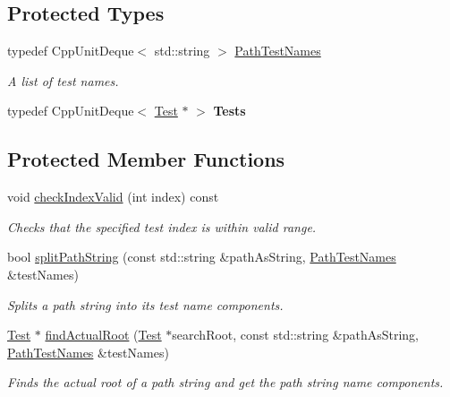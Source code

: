 \subsection*{Protected Types}
\begin{DoxyCompactItemize}
\item 
\hypertarget{class_test_path_a525c33f5b897710bf37cf593160e562a}{typedef Cpp\-Unit\-Deque$<$ std\-::string $>$ \hyperlink{class_test_path_a525c33f5b897710bf37cf593160e562a}{Path\-Test\-Names}}\label{class_test_path_a525c33f5b897710bf37cf593160e562a}

\begin{DoxyCompactList}\small\item\em A list of test names. \end{DoxyCompactList}\item 
\hypertarget{class_test_path_aa1f2a0a7e01597a16ed041776297fbdf}{typedef Cpp\-Unit\-Deque$<$ \hyperlink{class_test}{Test} $\ast$ $>$ {\bfseries Tests}}\label{class_test_path_aa1f2a0a7e01597a16ed041776297fbdf}

\end{DoxyCompactItemize}
\subsection*{Protected Member Functions}
\begin{DoxyCompactItemize}
\item 
void \hyperlink{class_test_path_aebf839170b1a9e8199dd26f307028b6a}{check\-Index\-Valid} (int index) const 
\begin{DoxyCompactList}\small\item\em Checks that the specified test index is within valid range. \end{DoxyCompactList}\item 
bool \hyperlink{class_test_path_a7b65b26e7287763ca94ff0fadca37652}{split\-Path\-String} (const std\-::string \&path\-As\-String, \hyperlink{class_test_path_a525c33f5b897710bf37cf593160e562a}{Path\-Test\-Names} \&test\-Names)
\begin{DoxyCompactList}\small\item\em Splits a path string into its test name components. \end{DoxyCompactList}\item 
\hyperlink{class_test}{Test} $\ast$ \hyperlink{class_test_path_a4fb2b835af58884dc718a3692f013868}{find\-Actual\-Root} (\hyperlink{class_test}{Test} $\ast$search\-Root, const std\-::string \&path\-As\-String, \hyperlink{class_test_path_a525c33f5b897710bf37cf593160e562a}{Path\-Test\-Names} \&test\-Names)
\begin{DoxyCompactList}\small\item\em Finds the actual root of a path string and get the path string name components. \end{DoxyCompactList}\end{DoxyCompactItemize}
